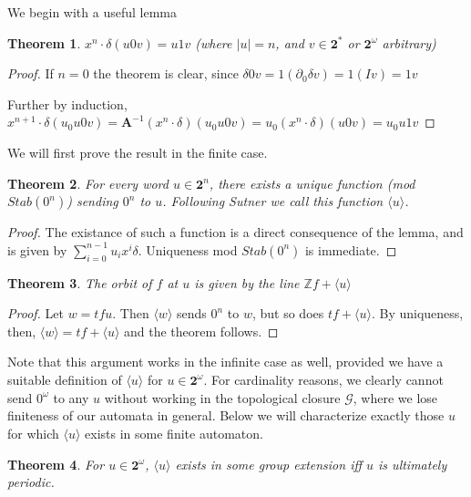 \documentclass[12pt]{article}
\newcommand{\G}{\mathcal{G}}
\newcommand{\Z}{\mathbb{Z}}
\newcommand{\2}{\textbf{2}}
\newcommand{\Am}{\textbf{A}}
\newcommand{\del}{\partial}
\newtheorem{thm}{Theorem}
\begin{document}
We begin with a useful lemma

\begin{thm}
  $x^n \cdot \delta (u0v) = u1v$ 
  (where $|u| = n$, and $v \in \2^*$ or $\2^\omega$ arbitrary)
\end{thm}

\begin{proof}
  If $n=0$ the theorem is clear, since 
  $\delta 0v = 1 (\del_0 \delta v) = 1 (I v) = 1v$

  Further by induction, 
  $x^{n+1} \cdot \delta (u_0u0v) = 
  \Am^{-1} (x^n \cdot \delta) (u_0u0v) =
  u_0 (x^n \cdot \delta) (u0v) =
  u_0u1v$
\end{proof}

We will first prove the result in the finite case.

\begin{thm}
  For every word $u \in \2^n$, there exists a unique function
  (mod $Stab(0^n)$) sending $0^n$ to $u$. Following Sutner
  \cite{SutnerLewi12:iter_inver_bin_trans} we call this function
  $\langle u \rangle$.
\end{thm}

\begin{proof}
  The existance of such a function is a direct consequence of the lemma,
  and is given by $\sum_{i=0}^{n-1} u_i x^i \delta$.
  Uniqueness mod $Stab(0^n)$ is immediate.
\end{proof}

\begin{thm}
  The orbit of $f$ at $u$ is given by the line $\Z f + \langle u \rangle$
\end{thm}

\begin{proof}
  Let $w = tf u$. Then $\langle w \rangle$ sends $0^n$ to $w$, 
  but so does $tf + \langle u \rangle$. By uniqueness, then,
  $\langle w \rangle = tf + \langle u \rangle$ and the theorem follows.
\end{proof}

Note that this argument works in the infinite case as well, provided 
we have a suitable definition of $\langle u \rangle$ for $u \in \2^\omega$.
For cardinality reasons, we clearly cannot send $0^\omega$ to any $u$ without
working in the topological closure $\widehat{\G}$, where we lose finiteness
of our automata in general. Below we will characterize exactly those $u$ 
for which $\langle u \rangle$ exists in some finite automaton.

\begin{thm}
  For $u \in \2^\omega$, $\langle u \rangle$ exists in some group extension
  iff $u$ is ultimately periodic.
\end{thm}
\end{document}
